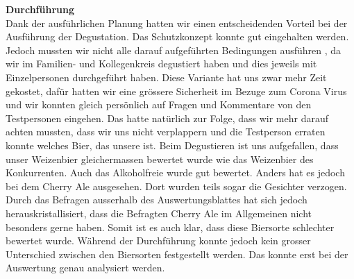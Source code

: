 \newpage
\textbf{Durchführung}\\
Dank der ausführlichen Planung hatten wir einen entscheidenden Vorteil bei der Ausführung der Degustation.
 Das Schutzkonzept konnte gut eingehalten werden. Jedoch mussten wir nicht alle darauf aufgeführten Bedingungen ausführen
 , da wir im Familien- und Kollegenkreis degustiert haben und dies jeweils mit Einzelpersonen durchgeführt haben. Diese Variante
hat uns zwar mehr Zeit gekostet, dafür hatten wir eine grössere Sicherheit im Bezuge zum Corona Virus und wir konnten gleich persönlich 
auf Fragen und Kommentare von den Testpersonen eingehen. Das hatte natürlich zur Folge, dass wir mehr darauf achten mussten, dass wir uns nicht
verplappern und die Testperson erraten konnte welches Bier, das unsere ist. Beim Degustieren ist uns aufgefallen, dass unser Weizenbier gleichermassen
bewertet wurde wie das Weizenbier des Konkurrenten. Auch das Alkoholfreie wurde gut bewertet. Anders hat es jedoch bei dem Cherry Ale
ausgesehen. Dort wurden teils sogar die Gesichter verzogen. Durch das Befragen ausserhalb des Auswertungsblattes hat sich jedoch
herauskristallisiert, dass die Befragten Cherry Ale im Allgemeinen nicht besonders gerne haben. Somit ist es auch klar, 
dass diese Biersorte schlechter bewertet wurde. Während der Durchführung konnte jedoch kein grosser Unterschied zwischen den Biersorten
festgestellt werden. Das konnte erst bei der Auswertung genau analysiert werden.
